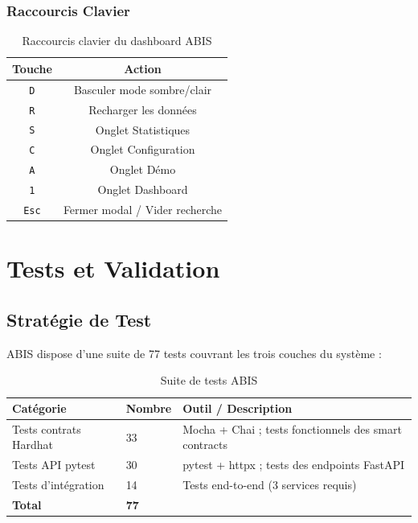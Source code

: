 \documentclass[12pt,a4paper]{report}
\begin{document}
\subsection{Raccourcis Clavier}

\begin{table}[H]
\centering
\caption{Raccourcis clavier du dashboard ABIS}
\label{tab:keyboard_shortcuts}
\begin{tabular}{cc}
\toprule
\textbf{Touche} & \textbf{Action} \\
\midrule
\texttt{D} & Basculer mode sombre/clair \\
\texttt{R} & Recharger les données \\
\texttt{S} & Onglet Statistiques \\
\texttt{C} & Onglet Configuration \\
\texttt{A} & Onglet Démo \\
\texttt{1} & Onglet Dashboard \\
\texttt{Esc} & Fermer modal / Vider recherche \\
\bottomrule
\end{tabular}
\end{table}

\chapter{Tests et Validation}
\vspace{0pt}
\vspace{1cm}

\section{Stratégie de Test}

ABIS dispose d'une suite de 77 tests couvrant les trois couches du système :

\begin{table}[H]
\centering
\caption{Suite de tests ABIS}
\label{tab:test_suite}
\begin{tabularx}{\linewidth}{L{4cm} C{2cm} L{7cm}}
\toprule
\textbf{Catégorie} & \textbf{Nombre} & \textbf{Outil / Description} \\
\midrule
Tests contrats Hardhat & 33 & Mocha + Chai ; tests fonctionnels des smart contracts \\
Tests API pytest & 30 & pytest + httpx ; tests des endpoints FastAPI \\
Tests d'intégration & 14 & Tests end-to-end (3 services requis) \\
\midrule
\textbf{Total} & \textbf{77} & \\
\bottomrule
\end{tabularx}
\end{table}
\end{document}
